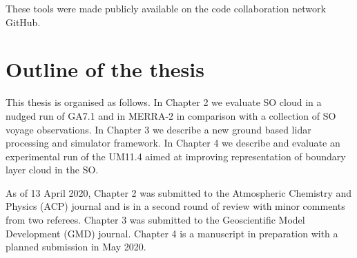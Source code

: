 \noindent
These tools were made publicly available on the code collaboration network
GitHub.

\section{Outline of the thesis}

This thesis is organised as follows. In Chapter 2 we evaluate
SO cloud in a nudged run of GA7.1 and in MERRA-2 in comparison
with a collection of SO voyage observations. In Chapter 3 we
describe a new ground based lidar processing and simulator framework.
In Chapter 4 we describe and evaluate an experimental run of the UM11.4 aimed at
improving representation of boundary layer cloud in the SO.

As of 13 April 2020, Chapter 2 was submitted to the Atmospheric
Chemistry and Physics (ACP) journal and is in a second round of review
with minor comments from two referees. Chapter 3 was submitted to the
Geoscientific Model Development (GMD) journal. Chapter 4 is a manuscript
in preparation with a planned submission in May 2020.
